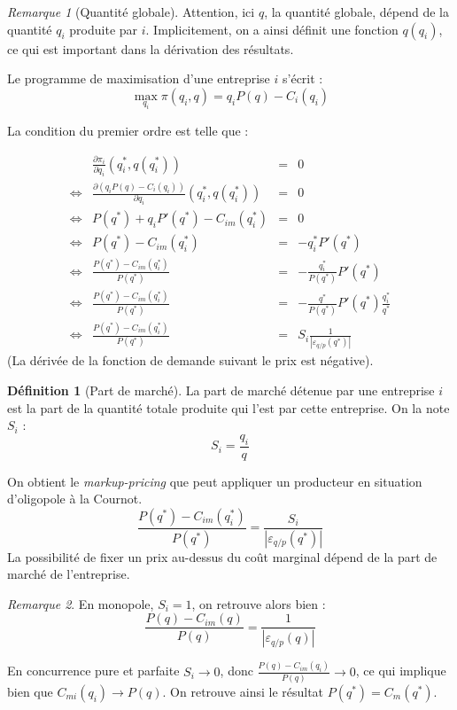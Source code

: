 \documentclass[
]{book}
\theoremstyle{definition}
\newtheorem{definition}{Définition}[chapter]
\theoremstyle{definition}
\theoremstyle{definition}
\theoremstyle{definition}
\theoremstyle{remark}
\newtheorem*{remark}{Remarque}
\begin{document}
\begin{remark}[Quantité globale]
Attention, ici \(q\), la quantité globale, dépend de la quantité \(q_i\) produite par \(i\).
Implicitement, on a ainsi définit une fonction \(q(q_i)\), ce qui est important dans la dérivation des résultats.
\end{remark}

Le programme de maximisation d'une entreprise \(i\) s'écrit :
\[
\max_{q_i}\pi(q_i, q) = q_iP(q) -C_i(q_i)
\]

La condition du premier ordre est telle que :

\[
\begin{array}{crcl}
&\frac{\partial \pi_i}{\partial q_i}(q_i^*, q(q_i^*)) &=& 0\\
\Leftrightarrow & \frac{\partial  \left(q_iP(q) -C_i(q_i)\right)}{\partial q_i}(q_i^*, q(q_i^*)) &= &0\\
\Leftrightarrow & P(q^*) + q_iP'(q^*) -C_{im}(q_i^*)&= &0\\
\Leftrightarrow & P(q^*) - C_{im}(q_i^*)&= &-q_i^*P'(q^*) \\
\Leftrightarrow & \frac{P(q^*)-C_{im}(q_i^*)}{P(q^*)}&= &-\frac{q_i^*}{P(q^*)}P'(q^*) \\
\Leftrightarrow & \frac{P(q^*) -C_{im}(q_i^*)}{P(q^*)}&= &-\frac{q^*}{P(q^*)}P'(q^*)\frac{q_i^*}{q^*} \\
\Leftrightarrow & \frac{P(q^*) - C_{im}(q_i^*)}{P(q^*)}&= &S_i\frac{1}{\left|\varepsilon_{q/p}(q^*)\right|}
\end{array}
\]
(La dérivée de la fonction de demande suivant le prix est négative).

\begin{definition}[Part de marché]
La part de marché détenue par une entreprise \(i\) est la part de la quantité totale produite qui l'est par cette entreprise.
On la note \(S_i\) :
\[S_i=\frac{q_i}{q}\]
\end{definition}

On obtient le \emph{markup-pricing} que peut appliquer un producteur en situation d'oligopole à la Cournot.
\[\frac{P(q^*) -C_{im}(q_i^*)}{P(q^*)}= \frac{S_i}{\left|\varepsilon_{q/p}(q^*)\right|}\]
La possibilité de fixer un prix au-dessus du coût marginal dépend de la part de marché de l'entreprise.

\begin{remark}
En monopole, \(S_i=1\), on retrouve alors bien :
\[\frac{P(q) -C_{im}(q)}{P(q)}= \frac{1}{\left|\varepsilon_{q/p}(q)\right|}\]

En concurrence pure et parfaite \(S_i\to 0\), donc \(\frac{P(q) -C_{im}(q_i)}{P(q)}\to 0\), ce qui implique bien que \(C_{mi}(q_i)\to P(q)\).
On retrouve ainsi le résultat \(P(q^*)=C_m(q^*)\).
\end{remark}
\end{document}
